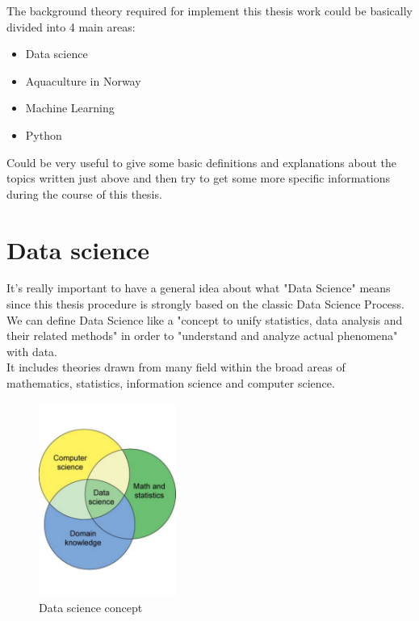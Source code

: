 

The background theory required for implement this thesis work could be basically divided into 4 main areas:
\begin{itemize}
\item Data science
\item Aquaculture in Norway
\item Machine Learning
\item Python
\end{itemize}

Could be very useful to give some basic definitions and explanations about the topics written just above and then try to get some more specific informations during the course of this thesis.

\newpage
\section{Data science}
It's really important to have a general idea about what "Data Science" means since this thesis procedure is strongly based on the classic Data Science Process.\\
We can define Data Science like a "concept to unify statistics, data analysis and their related methods" in order to "understand and analyze actual phenomena" with data.\\
It includes theories drawn from many field within the broad areas of mathematics, statistics, information science and computer science.

\begin{figure}[H]
	\centering
    \includegraphics[trim={0 3cm 0 3cm},clip,width=0.4\textwidth]{Files/Data_Science_Concept.pdf}
    \caption{Data science concept}
    \label{fig: Data_science}
\end{figure}



